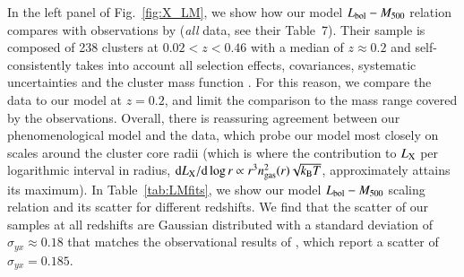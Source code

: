 \documentclass[useAMS,usenatbib]{mn2e}
\newcommand{\dd}{\mathrm{d}}
\begin{document}
In the left panel of Fig.~\ref{fig:X_LM}, we show how our model
$L_{{\mathrm{bol}}}-M_{500}$ relation compares with observations by
\cite{2010MNRAS.406.1773M} (\emph{all} data, see their Table~7). Their sample is
composed of 238 clusters at $0.02<z<0.46$ with a median of $z \approx 0.2$ and
self-consistently takes into account all selection effects, covariances,
systematic uncertainties and the cluster mass function
\citep{2010MNRAS.406.1759M}.  For this reason, we compare the
\cite{2010MNRAS.406.1773M} data to our model at $z=0.2$, and limit the
comparison to the mass range covered by the observations. Overall, there is
reassuring agreement between our phenomenological model and the data, which
probe our model most closely on scales around the cluster core radii (which is
where the contribution to $L_{{\mathrm{X}}}$ per logarithmic interval in radius, $\dd
L_{\rmn{X}}/\dd\log r \propto r^3 n_{\rm{gas}}^2(r) \sqrt{k_{\rmn{B}}T}$,
approximately attains its maximum).  In Table~\ref{tab:LMfits}, we show our
model $L_{{\mathrm{bol}}}-M_{500}$ scaling relation and its scatter for different
redshifts. We find that the scatter of our samples at all redshifts are Gaussian
distributed with a standard deviation of $\sigma_{yx} \approx 0.18$ that matches
the observational results of \cite{2010MNRAS.406.1773M}, which report a scatter
of $\sigma_{yx} = 0.185$.
\end{document}
